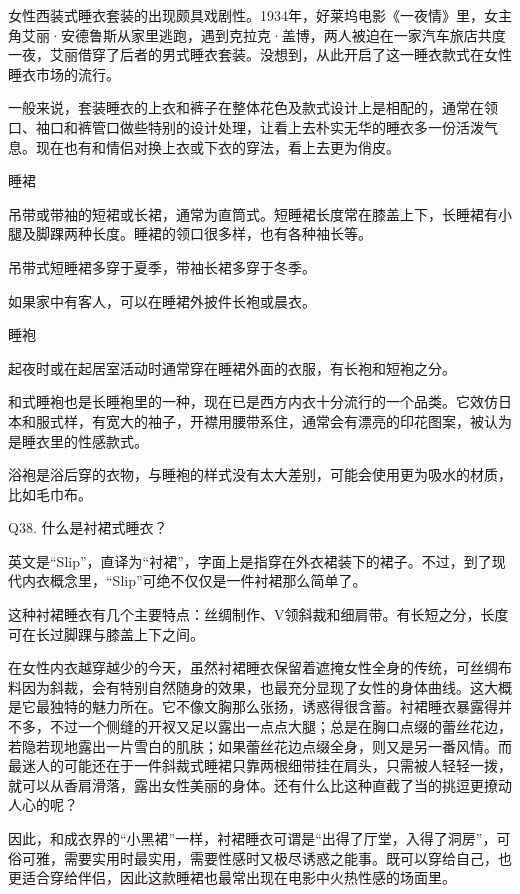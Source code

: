 \documentclass[12pt,UTF8]{ctexbook}
\begin{document}
女性西装式睡衣套装的出现颇具戏剧性。1934年，好莱坞电影《一夜情》里，女主角艾丽·安德鲁斯从家里逃跑，遇到克拉克·盖博，两人被迫在一家汽车旅店共度一夜，艾丽借穿了后者的男式睡衣套装。没想到，从此开启了这一睡衣款式在女性睡衣市场的流行。

一般来说，套装睡衣的上衣和裤子在整体花色及款式设计上是相配的，通常在领口、袖口和裤管口做些特别的设计处理，让看上去朴实无华的睡衣多一份活泼气息。现在也有和情侣对换上衣或下衣的穿法，看上去更为俏皮。


睡裙


吊带或带袖的短裙或长裙，通常为直筒式。短睡裙长度常在膝盖上下，长睡裙有小腿及脚踝两种长度。睡裙的领口很多样，也有各种袖长等。

吊带式短睡裙多穿于夏季，带袖长裙多穿于冬季。

如果家中有客人，可以在睡裙外披件长袍或晨衣。

睡袍


起夜时或在起居室活动时通常穿在睡裙外面的衣服，有长袍和短袍之分。

和式睡袍也是长睡袍里的一种，现在已是西方内衣十分流行的一个品类。它效仿日本和服式样，有宽大的袖子，开襟用腰带系住，通常会有漂亮的印花图案，被认为是睡衣里的性感款式。

浴袍是浴后穿的衣物，与睡袍的样式没有太大差别，可能会使用更为吸水的材质，比如毛巾布。





Q38. 什么是衬裙式睡衣？


英文是“Slip”，直译为“衬裙”，字面上是指穿在外衣裙装下的裙子。不过，到了现代内衣概念里，“Slip”可绝不仅仅是一件衬裙那么简单了。

这种衬裙睡衣有几个主要特点：丝绸制作、V领斜裁和细肩带。有长短之分，长度可在长过脚踝与膝盖上下之间。





在女性内衣越穿越少的今天，虽然衬裙睡衣保留着遮掩女性全身的传统，可丝绸布料因为斜裁，会有特别自然随身的效果，也最充分显现了女性的身体曲线。这大概是它最独特的魅力所在。它不像文胸那么张扬，诱惑得很含蓄。衬裙睡衣暴露得并不多，不过一个侧缝的开衩又足以露出一点点大腿；总是在胸口点缀的蕾丝花边，若隐若现地露出一片雪白的肌肤；如果蕾丝花边点缀全身，则又是另一番风情。而最迷人的可能还在于一件斜裁式睡裙只靠两根细带挂在肩头，只需被人轻轻一拨，就可以从香肩滑落，露出女性美丽的身体。还有什么比这种直截了当的挑逗更撩动人心的呢？

因此，和成衣界的“小黑裙”一样，衬裙睡衣可谓是“出得了厅堂，入得了洞房”，可俗可雅，需要实用时最实用，需要性感时又极尽诱惑之能事。既可以穿给自己，也更适合穿给伴侣，因此这款睡裙也最常出现在电影中火热性感的场面里。
\end{document}
